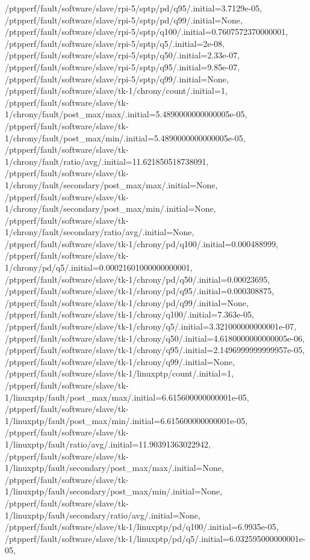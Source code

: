 {    /ptpperf/fault/software/slave/rpi-5/sptp/pd/q95/.initial=3.7129e-05,
    /ptpperf/fault/software/slave/rpi-5/sptp/pd/q99/.initial=None,
    /ptpperf/fault/software/slave/rpi-5/sptp/q100/.initial=0.7607572370000001,
    /ptpperf/fault/software/slave/rpi-5/sptp/q5/.initial=2e-08,
    /ptpperf/fault/software/slave/rpi-5/sptp/q50/.initial=2.33e-07,
    /ptpperf/fault/software/slave/rpi-5/sptp/q95/.initial=9.85e-07,
    /ptpperf/fault/software/slave/rpi-5/sptp/q99/.initial=None,
    /ptpperf/fault/software/slave/tk-1/chrony/count/.initial=1,
    /ptpperf/fault/software/slave/tk-1/chrony/fault/post_max/max/.initial=5.4890000000000005e-05,
    /ptpperf/fault/software/slave/tk-1/chrony/fault/post_max/min/.initial=5.4890000000000005e-05,
    /ptpperf/fault/software/slave/tk-1/chrony/fault/ratio/avg/.initial=11.621850518738091,
    /ptpperf/fault/software/slave/tk-1/chrony/fault/secondary/post_max/max/.initial=None,
    /ptpperf/fault/software/slave/tk-1/chrony/fault/secondary/post_max/min/.initial=None,
    /ptpperf/fault/software/slave/tk-1/chrony/fault/secondary/ratio/avg/.initial=None,
    /ptpperf/fault/software/slave/tk-1/chrony/pd/q100/.initial=0.000488999,
    /ptpperf/fault/software/slave/tk-1/chrony/pd/q5/.initial=0.00021601000000000001,
    /ptpperf/fault/software/slave/tk-1/chrony/pd/q50/.initial=0.00023695,
    /ptpperf/fault/software/slave/tk-1/chrony/pd/q95/.initial=0.000308875,
    /ptpperf/fault/software/slave/tk-1/chrony/pd/q99/.initial=None,
    /ptpperf/fault/software/slave/tk-1/chrony/q100/.initial=7.363e-05,
    /ptpperf/fault/software/slave/tk-1/chrony/q5/.initial=3.321000000000001e-07,
    /ptpperf/fault/software/slave/tk-1/chrony/q50/.initial=4.6180000000000005e-06,
    /ptpperf/fault/software/slave/tk-1/chrony/q95/.initial=2.1496999999999957e-05,
    /ptpperf/fault/software/slave/tk-1/chrony/q99/.initial=None,
    /ptpperf/fault/software/slave/tk-1/linuxptp/count/.initial=1,
    /ptpperf/fault/software/slave/tk-1/linuxptp/fault/post_max/max/.initial=6.615600000000001e-05,
    /ptpperf/fault/software/slave/tk-1/linuxptp/fault/post_max/min/.initial=6.615600000000001e-05,
    /ptpperf/fault/software/slave/tk-1/linuxptp/fault/ratio/avg/.initial=11.90391363022942,
    /ptpperf/fault/software/slave/tk-1/linuxptp/fault/secondary/post_max/max/.initial=None,
    /ptpperf/fault/software/slave/tk-1/linuxptp/fault/secondary/post_max/min/.initial=None,
    /ptpperf/fault/software/slave/tk-1/linuxptp/fault/secondary/ratio/avg/.initial=None,
    /ptpperf/fault/software/slave/tk-1/linuxptp/pd/q100/.initial=6.9935e-05,
    /ptpperf/fault/software/slave/tk-1/linuxptp/pd/q5/.initial=6.032595000000001e-05,
}
